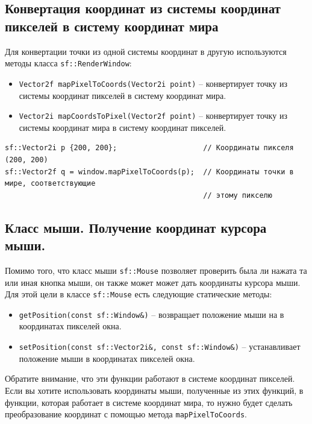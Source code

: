 \documentclass{article}
\begin{document}
\subsection*{Конвертация координат из системы координат пикселей в систему координат мира}
Для конвертации точки из одной системы координат в другую используются методы класса \texttt{sf::RenderWindow}:
\begin{itemize}
\item \texttt{Vector2f 	mapPixelToCoords(Vector2i point)} -- конвертирует точку из системы координат пикселей в систему координат мира.
\item \texttt{Vector2i 	mapCoordsToPixel(Vector2f point)} -- конвертирует точку из системы координат мира в систему координат пикселей.
\end{itemize}
\begin{lstlisting}[frame=none]
sf::Vector2i p {200, 200};                    // Координаты пикселя (200, 200)
sf::Vector2f q = window.mapPixelToCoords(p);  // Координаты точки в мире, соответствующие 
                                              // этому пикселю
\end{lstlisting}


\newpage
\subsection*{Класс мыши. Получение координат курсора мыши.}
Помимо того, что класс мыши \texttt{sf::Mouse} позволяет проверить была ли нажата та или иная кнопка мыши, он также может может дать координаты курсора мыши. Для этой цели в классе \texttt{sf::Mouse} есть следующие статические методы:
\begin{itemize}
\item \texttt{getPosition(const sf::Window\&)} -- возвращает положение мыши на в координатах пикселей окна.
\item \texttt{setPosition(const sf::Vector2i\&, const sf::Window\&)} --  устанавливает положение мыши в координатах пикселей окна.
\end{itemize}
Обратите внимание, что эти функции работают в системе координат пикселей. Если вы хотите использовать координаты мыши, полученные из этих функций, в функции, которая работает в системе координат мира, то нужно будет сделать преобразование координат с помощью метода \texttt{mapPixelToCoords}.
\end{document}

